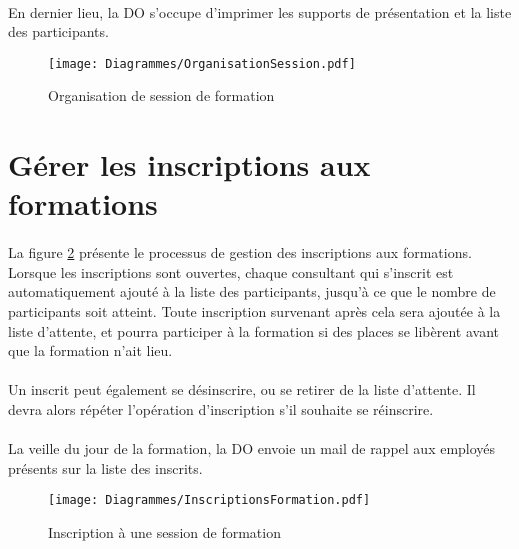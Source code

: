 \paragraph{} En dernier lieu, la DO s'occupe d'imprimer les supports de présentation et la liste des participants.
\begin{figure}[H]
	\centering
\begin{sideways}
	\texttt{[image: Diagrammes/OrganisationSession.pdf]}
\end{sideways}
	\caption{Organisation de session de formation} 
	\label{orgaForm}
\end{figure}




\section{Gérer les inscriptions aux formations}
\label{sec:inscriptions}
\paragraph{} La figure \ref{inscriptionForm} présente le processus de gestion des inscriptions aux formations. Lorsque les inscriptions sont ouvertes, chaque consultant qui s'inscrit est automatiquement ajouté à la liste des participants, jusqu'à ce que le nombre de participants soit atteint. Toute inscription survenant après cela sera ajoutée à la liste d'attente, et pourra participer à la formation si des places se libèrent avant que la formation n'ait lieu.
\paragraph{} Un inscrit peut également se désinscrire, ou se retirer de la liste d'attente. Il devra alors répéter l'opération d'inscription s'il souhaite se réinscrire.
\paragraph{} La veille du jour de la formation, la DO envoie un mail de rappel aux employés présents sur la liste des inscrits. 


\begin{figure}[H]
\centering
\begin{sideways}
	\texttt{[image: Diagrammes/InscriptionsFormation.pdf]}
\end{sideways}
	\caption{Inscription à une session de formation}
	\label{inscriptionForm}
\end{figure}



